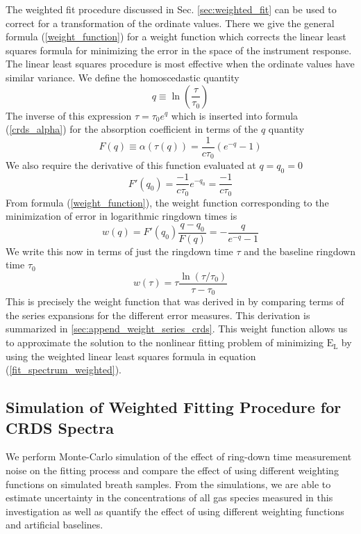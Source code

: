 \documentclass[12pt]{report}
\begin{document}
	The weighted fit procedure discussed in Sec. \ref{sec:weighted_fit} can be used to correct for a transformation of the ordinate values. There we give the general formula (\ref{weight_function}) for a weight function which corrects the linear least squares formula for minimizing the error in the space of the instrument response. The linear least squares procedure is most effective when the ordinate values have similar variance. We define the homoscedastic quantity
	\begin{equation}
		q \equiv \ln \left(\frac{\tau}{\tau_0}\right)
	\end{equation}
	The inverse of this expression $\tau = \tau_0 e^q$ which is inserted into formula (\ref{crds_alpha}) for the absorption coefficient in terms of the $q$ quantity
	\begin{equation}
		F(q) \equiv \alpha(\tau(q)) = \frac{1}{c\tau_0}\left(e^{-q} - 1\right)
	\end{equation}
	We also require the derivative of this function evaluated at $q = q_0 = 0$
	\begin{equation}
		F'(q_0) = \frac{-1}{c\tau_0}e^{-q_0} = \frac{-1}{c\tau_0}
	\end{equation}
	From formula (\ref{weight_function}), the weight function corresponding to the minimization of error in logarithmic ringdown times is
	\begin{equation}
		w(q) = F'(q_0)\frac{q - q_0}{F(q)} = -\frac{q}{e^{-q} - 1}
	\end{equation}
	We write this now in terms of just the ringdown time $\tau$ and the baseline ringdown time $\tau_0$
	\begin{equation}
		w(\tau) = \tau \frac{\ln\left(\tau/\tau_0\right)}{\tau - \tau_0}
	\end{equation}
	This is precisely the weight function that was derived in \cite{mine_acetone} by comparing terms of the series expansions for the different error measures. This derivation is summarized in \ref{sec:append_weight_series_crds}. This weight function allows us to approximate the solution to the nonlinear fitting problem of minimizing $\mathrm{E}_\mathrm{L}$ by using the weighted linear least squares formula in equation (\ref{fit_spectrum_weighted}).
	
	\subsection{Simulation of Weighted Fitting Procedure for CRDS Spectra} \label{sec:simulation}
	We perform Monte-Carlo simulation of the effect of ring-down time measurement noise on the fitting process and compare the effect of using different weighting functions on simulated breath samples. From the simulations, we are able to estimate uncertainty in the concentrations of all gas species measured in this investigation as well as quantify the effect of using different weighting functions and artificial baselines.
	
\end{document}
